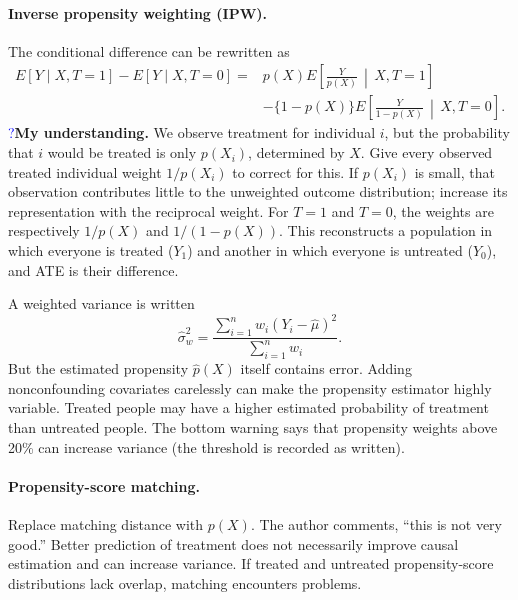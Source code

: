 \documentclass[11pt,a4paper]{article}
\newcommand{\inkblue}[1]{\textcolor{blue}{#1}}
\begin{document}
{\paragraph{Inverse propensity weighting (IPW).}
The conditional difference can be rewritten as
\begin{align*}
E[Y\mid X,T=1]-E[Y\mid X,T=0]
={}&p(X)E\!\left[\frac{Y}{p(X)}\,\middle|\,X,T=1\right]\\
&-\{1-p(X)\}E\!\left[\frac{Y}{1-p(X)}\,\middle|\,X,T=0\right].
\end{align*}
\inkblue{?}\quad\textbf{My understanding.} We observe treatment for individual $i$, but the probability that $i$ would be treated is only $p(X_i)$, determined by $X$. Give every observed treated individual weight $1/p(X_i)$ to correct for this. If $p(X_i)$ is small, that observation contributes little to the unweighted outcome distribution; increase its representation with the reciprocal weight. For $T=1$ and $T=0$, the weights are respectively $1/p(X)$ and $1/(1-p(X))$. This reconstructs a population in which everyone is treated ($Y_1$) and another in which everyone is untreated ($Y_0$), and ATE is their difference.

A weighted variance is written
\[\hat\sigma_w^2=\frac{\sum_{i=1}^n w_i(Y_i-\hat\mu)^2}{\sum_{i=1}^n w_i}.\]
But the estimated propensity $\hat p(X)$ itself contains error. Adding nonconfounding covariates carelessly can make the propensity estimator highly variable. Treated people may have a higher estimated probability of treatment than untreated people. The bottom warning says that propensity weights above 20\% can increase variance (the threshold is recorded as written).

\paragraph{Propensity-score matching.}
Replace matching distance with $p(X)$. The author comments, ``this is not very good.'' Better prediction of treatment does not necessarily improve causal estimation and can increase variance. If treated and untreated propensity-score distributions lack overlap, matching encounters problems.

\begin{center}
\end{center}}
\end{document}
